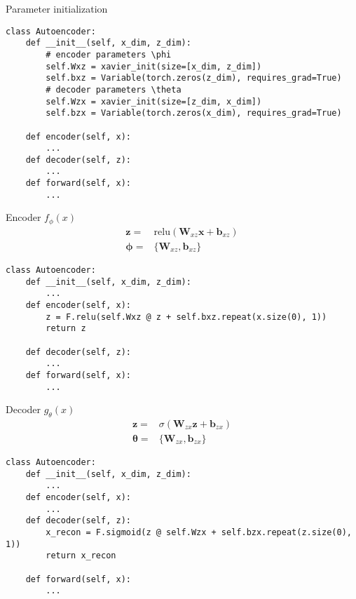 \documentclass{beamer}
\newcommand{\relu}{\mathrm{relu}}
\begin{document}
\begin{frame}[fragile]{Parameter initialization}
\begin{verbatim}
class Autoencoder:
    def __init__(self, x_dim, z_dim):
        # encoder parameters \phi
        self.Wxz = xavier_init(size=[x_dim, z_dim])
        self.bxz = Variable(torch.zeros(z_dim), requires_grad=True)
        # decoder parameters \theta
        self.Wzx = xavier_init(size=[z_dim, x_dim])
        self.bzx = Variable(torch.zeros(x_dim), requires_grad=True)

    def encoder(self, x):
        ...
    def decoder(self, z):
        ...
    def forward(self, x):
        ...
\end{verbatim}
\end{frame}

\begin{frame}[fragile]{Encoder $f_\phi(x)$}
\begin{align}
	\mathbf{z} =& \relu\left(\mathbf{W}_{xz}\mathbf{x}+\mathbf{b}_{xz}\right)\\
	\bm{\phi}=&\{\mathbf{W}_{xz}, \mathbf{b}_{xz}\} 
\end{align}
\begin{verbatim}
class Autoencoder:
    def __init__(self, x_dim, z_dim):
        ...
    def encoder(self, x):
        z = F.relu(self.Wxz @ z + self.bxz.repeat(x.size(0), 1))
        return z
        
    def decoder(self, z):
        ...
    def forward(self, x):
        ...
\end{verbatim}
\end{frame}

\begin{frame}[fragile]{Decoder $g_\theta(x)$}
\begin{align}
	\mathbf{z} 
	=& \sigma\left(\mathbf{W}_{zx}\mathbf{z}+\mathbf{b}_{zx}\right)\\
\bm{\theta}=&\{\mathbf{W}_{zx}, \mathbf{b}_{zx}\} 
\end{align}
\begin{verbatim}
class Autoencoder:
    def __init__(self, x_dim, z_dim):
        ...
    def encoder(self, x):
        ...
    def decoder(self, z):
        x_recon = F.sigmoid(z @ self.Wzx + self.bzx.repeat(z.size(0), 1))
        return x_recon
	
    def forward(self, x):
        ...
\end{verbatim}
\end{frame}
\end{document}
